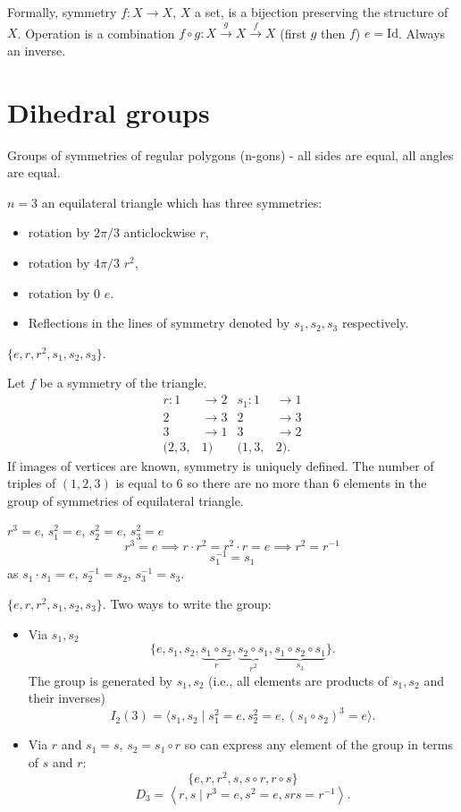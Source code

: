 \documentclass[10pt, a4paper]{article}
\begin{document}
Formally,
symmetry $f : X \to X$,
$X$ a set,
is a bijection preserving the structure of $X$.
Operation is a combination $f \circ g : X \xrightarrow{g} X \xrightarrow{f} X$
(first $g$ then $f$)
$e = \mathrm{Id}$.
Always an inverse.

\newpage

\section{Dihedral groups}
Groups of symmetries of regular polygons
(n-gons) -
all sides are equal,
all angles are equal.

$n = 3$ an equilateral triangle which has three symmetries:
\begin{itemize}
    \item rotation by $2\pi / 3$ anticlockwise $r$,

    \item rotation by $4\pi / 3$ $r ^ 2$,

    \item rotation by $0$ $e$.

    \item Reflections in the lines of symmetry denoted by $s_1, s_2, s_3$ respectively.
\end{itemize}
$\{e, r, r ^ 2, s_1, s_2, s_3\}$.

Let $f$ be a symmetry of the triangle.
\begin{align*}
    r : 1 &\to 2 & s_1 : 1 & \to 1 \\
    2 &\to 3 & 2 &\to 3 \\
    3 &\to 1 & 3 &\to  2 \\
    (2, 3, &1) & (1, 3, &2).
\end{align*}
If images of vertices are known,
symmetry is uniquely defined.
The number of triples of $(1, 2, 3)$ is equal to $6$ so there are no more than $6$ elements in the group of symmetries of equilateral triangle.

$r ^ 3 = e$,
$s_1 ^ 2 = e$,
$s_2 ^ 2 = e$,
$s_3 ^ 2 = e$
\[
r ^ 3 = e \implies r \cdot r ^ 2 = r ^ 2 \cdot r = e \implies r ^ 2 = r ^ {-1}
\]
\[
s_1 ^ {-1} = s_1
\]
as $s_1 \cdot s_1 = e$,
$s_2 ^ {-1} = s_2$,
$s_3 ^ {-1} = s_3$.

$\{e, r, r ^ 2, s_1, s_2, s_3\}$.
Two ways to write the group:
\begin{itemize}
    \item Via $s_1, s_2$
    \[
    \{e, s_1, s_2, \underbrace{s_1 \circ s_2}_{r}, \underbrace{s_2 \circ s_1}_{r ^ 2}, \underbrace{s_1 \circ s_2 \circ s_1}_{s_3}\}.
    \]
    The group is generated by $s_1, s_2$
    (i.e.,
    all elements are products of $s_1, s_2$ and their inverses)
    \[
    I_2(3) = \langle s_1, s_2 \mid s_1 ^ 2 = e, s_2 ^ 2 = e, (s_1 \circ s_2) ^ 3 = e\rangle.
    \]

    \item Via $r$ and $s_1 = s$,
    $s_2 = s_1 \circ r$ so can express any element of the group in terms of $s$ and $r$:
    \[
    \{e, r, r ^ 2, s, s \circ r, r \circ s\}
    \]
    \[
    D_3 = \left\langle r, s \mid r ^ 3 = e, s ^ 2 = e, srs = r ^ {-1}\right\rangle.
    \]
\end{itemize}
\end{document}
